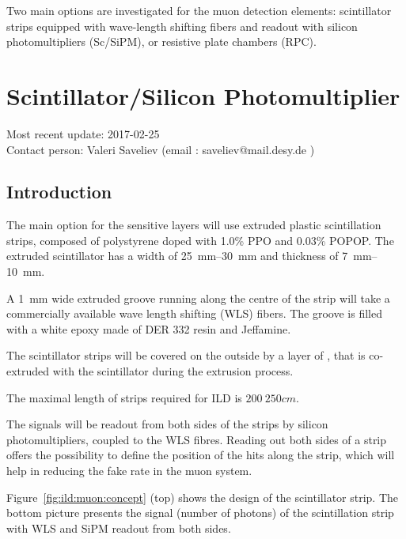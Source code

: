 Two main options are investigated for the muon detection elements: scintillator strips equipped with wave-length shifting fibers and readout with silicon photomultipliers (Sc/SiPM), or resistive plate chambers (RPC).

\section{Scintillator/Silicon Photomultiplier}
Most recent update: 2017-02-25 \\
Contact person: Valeri Saveliev (email : saveliev@mail.desy.de )

\subsection{Introduction}
The main option for the sensitive layers will use extruded plastic scintillation strips, composed of polystyrene doped with 1.0\% PPO and 0.03\% POPOP.
The extruded scintillator has a width of \SIrange{25}{30}{mm} and thickness of \SIrange{7}{10}{mm}.

A \SI{1}{mm} wide extruded groove running along the centre of the strip will take a commercially available wave length shifting (WLS) fibers.
The groove is filled with a white epoxy made of DER 332 resin and Jeffamine.

The scintillator strips will be covered on the outside by a layer of , that is co-extruded with the scintillator during the extrusion process.

The maximal length of strips required for ILD is $\SI{200}{250}{cm}$.

The signals will be readout from both sides of the strips by silicon photomultipliers, coupled to the WLS fibres.
Reading out both sides of a strip offers the possibility to define the position of the hits along the strip, which will help in reducing the fake rate in the muon system.

Figure~\ref{fig:ild:muon:concept} (top) shows the design of the scintillator strip. The bottom picture presents the signal (number of photons) of the scintillation strip with WLS and SiPM readout from both sides.

